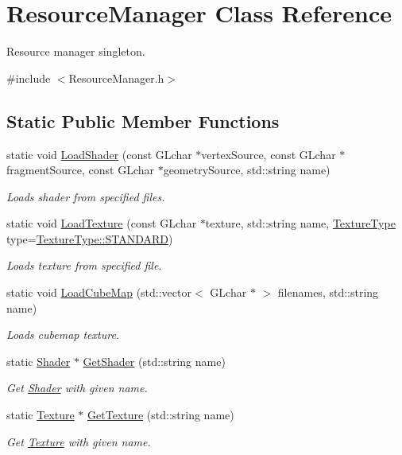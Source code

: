 \hypertarget{class_resource_manager}{}\section{Resource\+Manager Class Reference}
\label{class_resource_manager}


Resource manager singleton.  




{\ttfamily \#include $<$Resource\+Manager.\+h$>$}

\subsection*{Static Public Member Functions}
\begin{DoxyCompactItemize}
\item 
static void \mbox{\hyperlink{class_resource_manager_a00f5f597ddb23cfc50f5215e0768a336}{Load\+Shader}} (const G\+Lchar $\ast$vertex\+Source, const G\+Lchar $\ast$fragment\+Source, const G\+Lchar $\ast$geometry\+Source, std\+::string name)
\begin{DoxyCompactList}\small\item\em Loads shader from specified files. \end{DoxyCompactList}\item 
static void \mbox{\hyperlink{class_resource_manager_abe39b263c98ff63a9ce991b171356982}{Load\+Texture}} (const G\+Lchar $\ast$texture, std\+::string name, \mbox{\hyperlink{_texture_8h_a65468556d79304b3a4bfc464cc12e549}{Texture\+Type}} type=\mbox{\hyperlink{_texture_8h_a65468556d79304b3a4bfc464cc12e549a94e94133f4bdc1794c6b647b8ea134d0}{Texture\+Type\+::\+S\+T\+A\+N\+D\+A\+RD}})
\begin{DoxyCompactList}\small\item\em Loads texture from specified file. \end{DoxyCompactList}\item 
static void \mbox{\hyperlink{class_resource_manager_aa1b2f4a63ed096bbcd1e3732078f35f6}{Load\+Cube\+Map}} (std\+::vector$<$ G\+Lchar $\ast$ $>$ filenames, std\+::string name)
\begin{DoxyCompactList}\small\item\em Loads cubemap texture. \end{DoxyCompactList}\item 
static \mbox{\hyperlink{class_shader}{Shader}} $\ast$ \mbox{\hyperlink{class_resource_manager_ae95ecdc6de1127616485f7d069437332}{Get\+Shader}} (std\+::string name)
\begin{DoxyCompactList}\small\item\em Get \mbox{\hyperlink{class_shader}{Shader}} with given name. \end{DoxyCompactList}\item 
static \mbox{\hyperlink{class_texture}{Texture}} $\ast$ \mbox{\hyperlink{class_resource_manager_aa1456969a733c58bc47f372005699cbc}{Get\+Texture}} (std\+::string name)
\begin{DoxyCompactList}\small\item\em Get \mbox{\hyperlink{class_texture}{Texture}} with given name. \end{DoxyCompactList}\end{DoxyCompactItemize}
